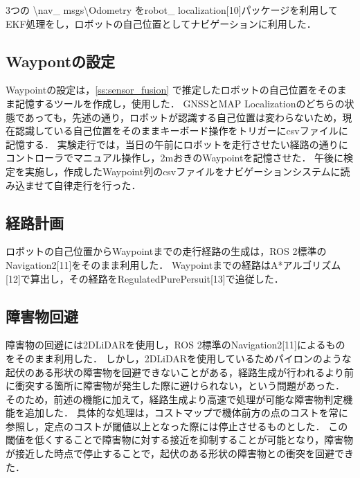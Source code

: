 \documentclass[platex,dvipdfmx]{rbproceedings}
\begin{document}
3つの \textbackslash nav\_ msgs\textbackslash Odometry をrobot\_ localization[10]パッケージを利用してEKF処理をし，ロボットの自己位置としてナビゲーションに利用した．

\subsection{Waypontの設定}
Waypointの設定は，\ref{ss:sensor_fusion} で推定したロボットの自己位置をそのまま記憶するツールを作成し，使用した．
GNSSとMAP Localizationのどちらの状態であっても，先述の通り，ロボットが認識する自己位置は変わらないため，現在認識している自己位置をそのままキーボード操作をトリガーにcsvファイルに記憶する．
実験走行では，当日の午前にロボットを走行させたい経路の通りにコントローラでマニュアル操作し，2mおきのWaypointを記憶させた．
午後に検定を実施し，作成したWaypoint列のcsvファイルをナビゲーションシステムに読み込ませて自律走行を行った．

\subsection{経路計画}
ロボットの自己位置からWaypointまでの走行経路の生成は，ROS 2標準のNavigation2[11]をそのまま利用した．
Waypointまでの経路はA*アルゴリズム[12]で算出し，その経路をRegulatedPurePersuit[13]で追従した．

\subsection{障害物回避} \label{ss:avoidance}
障害物の回避には2DLiDARを使用し，ROS 2標準のNavigation2[11]によるものをそのまま利用した．
しかし，2DLiDARを使用しているためパイロンのような起伏のある形状の障害物を回避できないことがある，経路生成が行われるより前に衝突する箇所に障害物が発生した際に避けられない，という問題があった．
そのため，前述の機能に加えて，経路生成より高速で処理が可能な障害物判定機能を追加した．
具体的な処理は，コストマップで機体前方の点のコストを常に参照し，定点のコストが閾値以上となった際には停止させるものとした．
この閾値を低くすることで障害物に対する接近を抑制することが可能となり，障害物が接近した時点で停止することで，起伏のある形状の障害物との衝突を回避できた．
\end{document}
